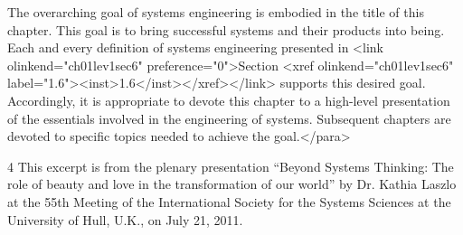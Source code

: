 The overarching goal of systems engineering is embodied in the title of this chapter. This goal is to bring successful systems and their products into being. Each and every definition of systems
engineering presented in <link olinkend="ch01lev1sec6" preference="0">Section <xref olinkend="ch01lev1sec6" label="1.6"><inst>1.6</inst></xref></link> supports this desired goal. Accordingly, it is appropriate to devote this chapter to a high-level presentation of the essentials involved in the engineering of systems. Subsequent chapters are devoted to specific topics needed to achieve the goal.</para>


4 This excerpt is from the plenary presentation “Beyond Systems Thinking: The role of beauty and love in the transformation of our world” by Dr. Kathia Laszlo at the 55th Meeting of the International Society for the Systems Sciences at the University of Hull, U.K., on July 21, 2011.


